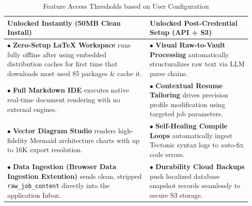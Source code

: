 \documentclass[10pt,a4paper]{article}
\begin{document}
\begin{table}[h]
\centering
\caption{Feature Access Thresholds based on User Configuration}
\vspace{2mm}
\small
\begin{tabular}{p{7.2cm}p{7.2cm}}
\toprule
\textbf{Unlocked Instantly (50MB Clean Install)} & \textbf{Unlocked Post-Credential Setup (API + S3)} \\
\midrule
$\bullet$ \textbf{Zero-Setup \LaTeX{} Workspace} runs fully offline after using embedded distribution caches for first time that downloads most used 85 packages \& cache it. & $\bullet$ \textbf{Visual Raw-to-Vault Processing} automatically structuralizes raw text via LLM parse chains. \\
\addlinespace
$\bullet$ \textbf{Full Markdown IDE} executes native real-time document rendering with no external engines. & $\bullet$ \textbf{Contextual Resume Tailoring} drives precision profile modification using targeted job parameters. \\
\addlinespace
$\bullet$ \textbf{Vector Diagram Studio} renders high-fidelity Mermaid architecture charts with up to 16K export resolution. & $\bullet$ \textbf{Self-Healing Compile Loops} automatically ingest Tectonic syntax logs to auto-fix code errors. \\
\addlinespace
$\bullet$ \textbf{ Data Ingestion (Browser Data Ingestion Extention)} sends clean, stripped \texttt{raw\_job\_content} directly into the application Inbox. & $\bullet$ \textbf{Durability Cloud Backups} push localized database snapshot records seamlessly to secure S3 storage. \\
\bottomrule
\end{tabular}
\end{table}
\end{document}
